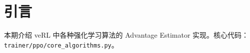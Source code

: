 \section{引言}
本期介绍 veRL 中各种强化学习算法的 Advantage Estimator 实现。核心代码：\texttt{trainer/ppo/core\_algorithms.py}。

